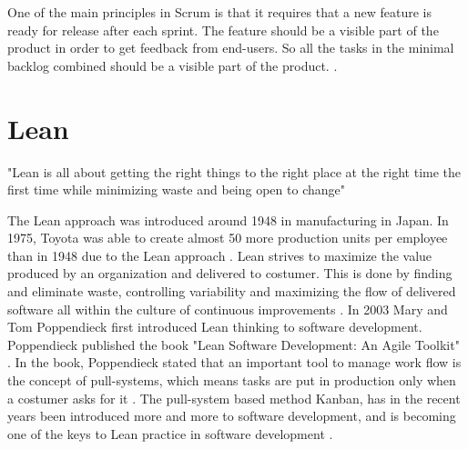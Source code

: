 \documentclass[UKenglish]{ifimaster}  %
\begin{document}
One of the main principles in Scrum is that it requires that a new feature is ready for release after each sprint. The feature should be a visible part of the product in order to get feedback from end-users. So all the tasks in the minimal backlog combined should be a visible part of the product.  \parencite{Scrum}.


\section {Lean}
\label{sec:Lean}
"Lean is all about getting the right things to the right place at the right time the first time while minimizing waste and being open to change" \parencite{741480}

The Lean approach was introduced around 1948 in manufacturing in Japan.  In 1975, Toyota was able to create almost 50 more production units per employee than in 1948 due to the Lean approach \parencite{manning}. Lean strives to maximize the value produced by an organization and delivered to costumer. This is done by finding and eliminate waste, controlling variability and maximizing the flow of delivered software all within the culture of continuous improvements \parencite{DavidAnderson}. In 2003 Mary and Tom Poppendieck first introduced Lean thinking to software development. Poppendieck published the book "Lean Software Development: An Agile Toolkit" \parencite{Lean:2003}. In the book, Poppendieck stated that an important tool to manage work flow is the concept of pull-systems, which means tasks are put in production only when a costumer asks for it \parencite{Lean:2009}.
The pull-system based method Kanban, has in the recent years been introduced more and more to software development, and is becoming one of the keys to Lean practice in software development \parencite{DavidAnderson}.  
\end{document}
